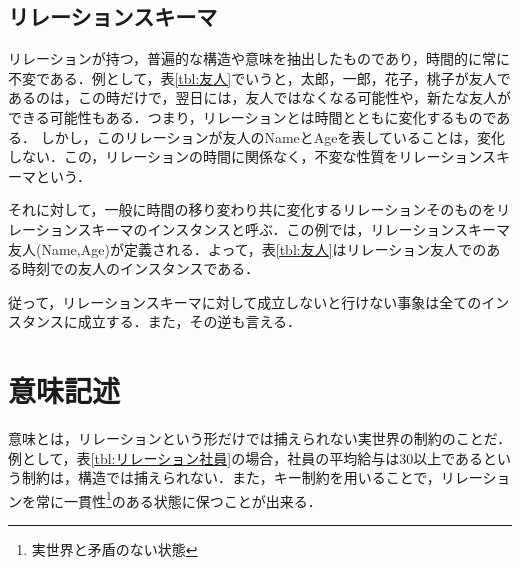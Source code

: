 \documentclass[a4paper,10pt]{jreport}
\begin{document}
\subsection{リレーションスキーマ}
リレーションが持つ，普遍的な構造や意味を抽出したものであり，時間的に常に不変である．例として，表\ref{tbl:友人}でいうと，太郎，一郎，花子，桃子が友人であるのは，この時だけで，翌日には，友人ではなくなる可能性や，新たな友人ができる可能性もある．つまり，リレーションとは時間とともに変化するものである．
しかし，このリレーションが友人のNameとAgeを表していることは，変化しない．この，リレーションの時間に関係なく，不変な性質をリレーションスキーマという．
\par それに対して，一般に時間の移り変わり共に変化するリレーションそのものをリレーションスキーマのインスタンスと呼ぶ．この例では，リレーションスキーマ友人(Name,Age)が定義される．よって，表\ref{tbl:友人}はリレーション友人でのある時刻での友人のインスタンスである．
\par 従って，リレーションスキーマに対して成立しないと行けない事象は全てのインスタンスに成立する．また，その逆も言える．


\section{意味記述}
意味とは，リレーションという形だけでは捕えられない実世界の制約のことだ．例として，表\ref{tbl:リレーション社員}の場合，社員の平均給与は30以上であるという制約は，構造では捕えられない．また，キー制約を用いることで，リレーションを常に一貫性\footnote{実世界と矛盾のない状態}のある状態に保つことが出来る．
\end{document}
